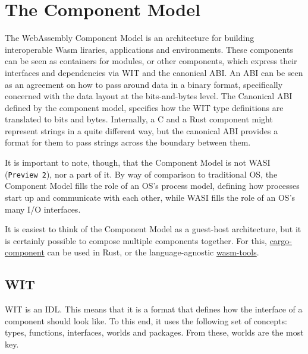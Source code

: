 \section{The Component Model}
\label{chap:component_model}


The WebAssembly Component Model is an architecture for building interoperable \gls{Wasm} liraries, applications and environments. These components can be seen as containers for modules, or other components, which express their interfaces and dependencies via \gls{WIT} and the canonical \gls{ABI}. 
An \gls{ABI} can be seen as an agreement on how to pass around data in a binary format, specifically concerned with the data layout at the bits-and-bytes level. The Canonical \gls{ABI} defined by the component model, specifies how the \gls{WIT} type definitions are translated to bits and bytes. Internally, a C and a Rust component might represent strings in a quite different way, but the canonical \gls{ABI} provides a format for them to pass strings across the boundary between them.

It is important to note, though, that the Component Model is not \gls{WASI} (\texttt{Preview 2}), nor a part of it. By way of comparison to traditional \gls{OS}, the Component Model fills the role of an \gls{OS}'s process model, defining how processes start up and communicate with each other, while \gls{WASI} fills the role of an \gls{OS}'s many I/O interfaces.

It is easiest to think of the Component Model as a guest-host architecture, but it is certainly possible to compose multiple components together. For this, \href{https://github.com/bytecodealliance/cargo-component}{cargo-component} can be used in Rust, or the language-agnostic \href{https://github.com/bytecodealliance/wasm-tools}{wasm-tools}.

\subsection{WIT}
\label{sec:wit}

\gls{WIT} is an \gls{IDL}. This means that it is a format that defines how the interface of a component should look like. To this end, it uses the following set of concepts: types, functions, interfaces, worlds and packages. From these, worlds are the most key.


